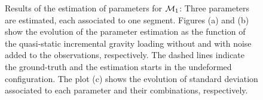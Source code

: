 \begin{figure}[th]%
\centering%
\hfill
{}
\hfill
{}
\caption{Results of the estimation of parameters for $\mathcal{M}_1$: Three parameters are estimated, each associated to 
one segment. Figures (a) and (b) show the evolution of the parameter estimation as the function of the quasi-static 
incremental gravity loading without and with noise added to the observations, respectively. The dashed lines indicate the ground-truth 
and the estimation starts in the undeformed configuration. The plot (c) shows the evolution of standard deviation 
associated to each parameter and their combinations, respectively.}
\label{f:cyl3Estim}
\end{figure}

